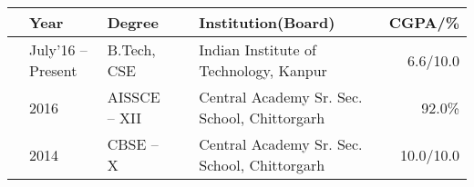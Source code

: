 
\newcommand{\education}[4]{
  & #1 & #2 & &#3 & #4
}
\begin{tabular}{ | L{0.05cm} l | L{3cm} | L{0.05cm} C{8cm} | r |}
  \hline
  \education{\textbf{Year}}{\textbf{Degree}}{\textbf{Institution(Board)}}{\textbf{CGPA/\%}}\\
  \hline
  \education{July'16 -- Present}{B.Tech, CSE}{Indian Institute of Technology, Kanpur}{6.6/10.0}\\
  \education{2016}{AISSCE -- XII}{Central Academy Sr. Sec. School, Chittorgarh}{92.0\%}\\
  \education{2014}{CBSE -- X}{Central Academy Sr. Sec. School, Chittorgarh}{10.0/10.0}\\
  \hline
\end{tabular}

